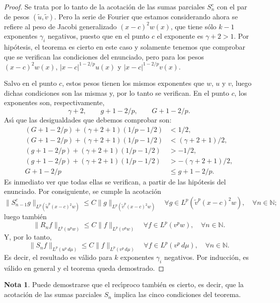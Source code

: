 \documentclass[a4paper,12pt]{article}
\theoremstyle{plain}
\theoremstyle{definition}
\newtheorem*{note}{Nota}
\newcommand{\N}{\mathbb{N}}
\begin{document}
\begin{proof}
Se trata por lo tanto de la acotaci\'on de las sumas parciales
$S_{n}^{c}$ con el par de pesos $( \tilde{u}, \tilde{v} )$.
Pero la serie de Fourier que estamos considerando ahora se refiere
al peso de Jacobi generalizado $(x-c)^{2}w(x)$, que tiene s\'olo $k-1$
exponentes $\gamma_{i}$ negativos, puesto que en el
punto $c$ el exponente es $\gamma + 2 > 1$.
Por hip\'otesis, el teorema es cierto en este caso y solamente
tenemos que comprobar que se verifican las condiciones del enunciado,
pero para los pesos
$(x-c)^{2}w(x)$, $| x - c |^{1-2/p} u(x)$
y $| x - c |^{1-2/p} v(x)$.

Salvo en el punto $c$, estos pesos tienen los mismos exponentes
que $w$, $u$ y $v$, luego dichas condiciones son las mismas y, por
lo tanto se verifican. En el punto $c$, los exponentes son, respectivamente,
$$
\gamma + 2,\qquad g + 1 - 2/p,\qquad G + 1 - 2/p.
$$
As\'{\i} que las desigualdades que debemos comprobar son:
\begin{align*}
(G + 1 - 2/p) + ( \gamma + 2 + 1 ) (1/p - 1/2 ) &< 1/2,\\
(G + 1 - 2/p) + ( \gamma + 2 + 1 ) (1/p - 1/2 ) &< ( \gamma + 2 + 1 )/2,\\
(g + 1 - 2/p) + ( \gamma + 2 + 1 ) (1/p - 1/2 ) &> - 1/2,\\
(g + 1 - 2/p) + ( \gamma + 2 + 1 ) (1/p - 1/2 ) &> - ( \gamma + 2 + 1 )/2,\\
G + 1 - 2/p &\leq g + 1 - 2/p.
\end{align*}
Es inmediato ver que todas ellas se verifican, a partir de
las hip\'otesis del enunciado. Por consiguiente, se cumple la
acotaci\'on
$$
\| S_{n-1}^{c}g \|_{L^{p}({\tilde{u}}^{p}(x-c)^{2}w)}
\leq C \| g \|_{L^{p}({\tilde{v}}^{p}(x-c)^{2}w)}
\quad\forall g \in L^{p}({\tilde{v}}^{p}(x-c)^{2}w),
\quad\forall n \in \N;
$$
luego tambi\'{e}n
$$
\| R_{n}f \|_{L^{p}(u^{p}w)} \leq C \| f \|_{L^{p}(v^{p}w)}
\quad\forall f \in L^{p}(v^{p}w), \quad\forall n \in \N.
$$
Y, por lo tanto,
$$
\| S_{n}f \|_{L^{p}(u^{p}\,d\mu)} \leq C \| f \|_{L^{p}(v^{p}\,d\mu)}
\quad\forall f \in L^{p}(v^{p}\,d\mu), \quad\forall n \in \N.
$$
Es decir, el resultado es v\'alido para $k$ exponentes $\gamma_{i}$ negativos.
Por inducci\'on, es v\'alido en general y el teorema
queda demostrado.
\end{proof}

\begin{note}
Puede demostrarse que el rec\'{\i}proco tambi\'{e}n es
cierto, es decir, que la acotaci\'on de las sumas parciales $S_{n}$
implica las cinco condiciones del teorema.
\end{note}
\end{document}
